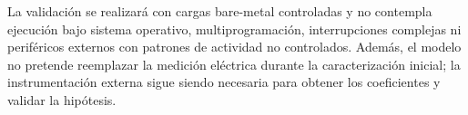 La validación se realizará con cargas bare-metal controladas y no contempla
ejecución bajo sistema operativo, multiprogramación, interrupciones complejas ni
periféricos externos con patrones de actividad no controlados. Además, el modelo
no pretende reemplazar la medición eléctrica durante la caracterización inicial;
la instrumentación externa sigue siendo necesaria para obtener los coeficientes
y validar la hipótesis.

